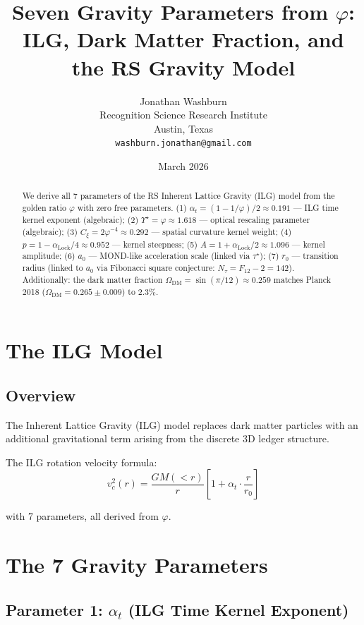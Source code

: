 \documentclass[12pt,a4paper]{article}
\title{Seven Gravity Parameters from $\varphi$:\\
ILG, Dark Matter Fraction, and the RS Gravity Model}
\author{Jonathan Washburn\\
Recognition Science Research Institute\\
Austin, Texas\\
\texttt{washburn.jonathan@gmail.com}}
\date{March 2026}
\theoremstyle{definition}
\theoremstyle{remark}
\begin{document}
\maketitle

\begin{abstract}
We derive all 7 parameters of the RS Inherent Lattice Gravity (ILG) model from 
the golden ratio $\varphi$ with zero free parameters. 
(1) $\alpha_t = (1 - 1/\varphi)/2 \approx 0.191$ — ILG time kernel exponent (algebraic); 
(2) $\Upsilon^\star = \varphi \approx 1.618$ — optical rescaling parameter (algebraic); 
(3) $C_\xi = 2\varphi^{-4} \approx 0.292$ — spatial curvature kernel weight; 
(4) $p = 1 - \alpha_\mathrm{Lock}/4 \approx 0.952$ — kernel steepness; 
(5) $A = 1 + \alpha_\mathrm{Lock}/2 \approx 1.096$ — kernel amplitude; 
(6) $a_0$ — MOND-like acceleration scale (linked via $\tau^\star$); 
(7) $r_0$ — transition radius (linked to $a_0$ via Fibonacci square conjecture: 
$N_\tau = F_{12} - 2 = 142$).
Additionally: the dark matter fraction $\Omega_\mathrm{DM} = \sin(\pi/12) \approx 0.259$ 
matches Planck 2018 ($\Omega_\mathrm{DM} = 0.265 \pm 0.009$) to $2.3\%$.
\end{abstract}

\section{The ILG Model}

\subsection{Overview}

The Inherent Lattice Gravity (ILG) model replaces dark matter particles with an 
additional gravitational term arising from the discrete 3D ledger structure.

The ILG rotation velocity formula:
\begin{equation}
v_c^2(r) = \frac{GM(<r)}{r}\left[1 + \alpha_t \cdot \frac{r}{r_0}\right]
\end{equation}

with 7 parameters, all derived from $\varphi$.

\section{The 7 Gravity Parameters}

\subsection{Parameter 1: $\alpha_t$ (ILG Time Kernel Exponent)}
\end{document}
